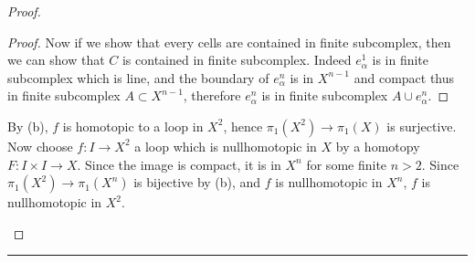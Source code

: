 \begin{proof}
\begin{enumerate}[label=(\alph*)]
{\begin{proof}
Now if we show that every cells are contained in finite subcomplex, then we can show that $C$ is contained in finite subcomplex. Indeed $e_\alpha^1$ is in finite subcomplex which is line, and the boundary of $e_\alpha^n$ is in $X^{n-1}$ and compact thus in finite subcomplex $A\subset X^{n-1}$, therefore $e_\alpha^n$ is in finite subcomplex $A\cup e_\alpha^n$.
\end{proof}} By (b), $f$ is homotopic to a loop in $X^2$, hence $\pi_1(X^2)\rightarrow \pi_1(X)$ is surjective. Now choose $f:I\rightarrow X^2$ a loop which is nullhomotopic in $X$ by a homotopy $F:I\times I\rightarrow X$. Since the image is compact, it is in $X^n$ for some finite $n>2$. Since $\pi_1(X^2)\rightarrow \pi_1(X^n)$ is bijective by (b), and $f$ is nullhomotopic in $X^n$, $f$ is nullhomotopic in $X^2$. 
\end{enumerate}
\end{proof}
\noindent\rule{\textwidth}{1pt}
\newline
